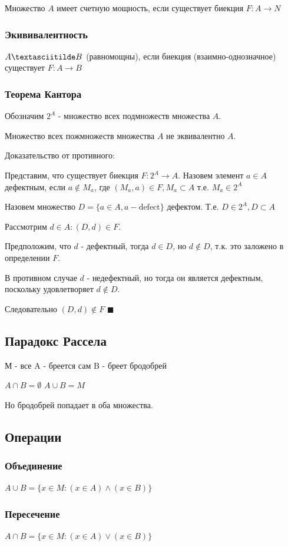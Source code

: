 \documentclass[letterpaper]{article}
\begin{document}
Множество \(A\) имеет счетную мощность, если существует биекция \(F: A \rightarrow N\)
\subsubsection{Экививалентность}
\label{sec:org8a71f8d}
\(A \textasciitilde B\) (равномощны), если биекция (взаимно-однозначное) существует \(F: A \rightarrow B\)
\subsubsection{Теорема Кантора}
\label{sec:org4d24072}
Обозначим \(2^A\) - множество всех подмножеств множества \(A\).

Множество всех пожмножеств множества \(A\) не эквивалентно \(A\).

Доказательство от противного:

Представим, что существует биекция \(F: 2^A \rightarrow A\).
Назовем элемент \(a \in A\) дефектным,
если \(a \notin M_a\), где \((M_a, a) \in F, M_a \subset A\) т.е. \(M_a \in 2^A\)

Назовем множество \(D = \{a \in A, a - \text{defect}\}\) дефектом.
Т.е. \(D \in 2^A, D \subset A\)

Рассмотрим \(d \in A: (D, d) \in F\).

Предположим, что \(d\) - дефектный, тогда \(d \in D\), но \(d \notin D\),
т.к. это заложено в определении \(F\).

В противном случае \(d\) - недефектный, но тогда он является дефектным, поскольку удовлетворяет \(d \notin D\).

Следовательно \((D, d) \notin F\)
\(\blacksquare\)
\subsection{Парадокс Рассела}
\label{sec:org462104c}
М - все
A - бреется сам
B - бреет бродобрей

\(A \cap B = \emptyset\)
\(A \cup B = M\)

Но бродобрей попадает в оба множества.
\subsection{Операции}
\label{sec:org965f022}
\subsubsection{Объединение}
\label{sec:orgd63e4d1}
\(A \cup B = \{x \in M: (x \in A) \land (x \in B)\}\)
\subsubsection{Пересечение}
\label{sec:orge751ba0}
\(A \cap B = \{x \in M: (x \in A) \lor (x \in B)\}\)
\end{document}
